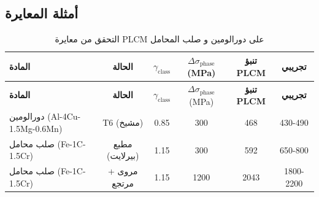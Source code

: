 \documentclass[11pt,a4paper]{article}
\begin{document}
\begin{otherlanguage}{arabic}
		\subsection{أمثلة المعايرة}
		
		\begin{longtable}{lccccc}
			\caption{التحقق من معايرة PLCM على دورالومين و صلب المحامل} \label{tab:calibration-validation} \\
			\toprule
			\textbf{المادة} & \textbf{الحالة} & \(\gamma_{\text{class}}\) & \(\Delta\sigma_{\text{phase}}\) (MPa) & \textbf{تنبؤ PLCM} & \textbf{تجريبي} \\
			\midrule
			\endfirsthead
			\toprule
			\textbf{المادة} & \textbf{الحالة} & \(\gamma_{\text{class}}\) & \(\Delta\sigma_{\text{phase}}\) (MPa) & \textbf{تنبؤ PLCM} & \textbf{تجريبي} \\
			\midrule
			\endhead
			دورالومين (Al-4Cu-1.5Mg-0.6Mn) & T6 (مشيخ) & 0.85 & 300 & 468 & 430-490 \\
			صلب محامل (Fe-1C-1.5Cr) & مطبع (بيرلايت) & 1.15 & 300 & 592 & 650-800 \\
			صلب محامل (Fe-1C-1.5Cr) & مروى + مرتجع & 1.15 & 1200 & 2043 & 1800-2200 \\
			\bottomrule
		\end{longtable}
		
	\end{otherlanguage}
	
\end{document}
